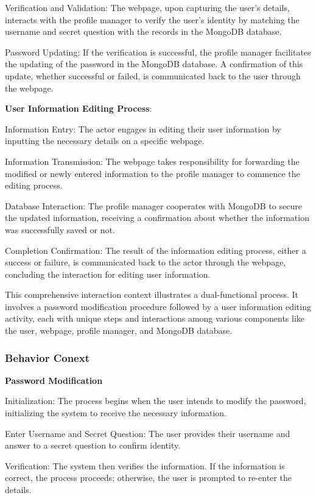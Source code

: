 \documentclass[conference]{IEEEtran}
\begin{document}
Verification and Validation: The webpage, upon capturing the user's details, interacts with the profile manager to verify the user's identity by matching the username and secret question with the records in the MongoDB database.

Password Updating: If the verification is successful, the profile manager facilitates the updating of the password in the MongoDB database. A confirmation of this update, whether successful or failed, is communicated back to the user through the webpage.

\textbf{ User Information Editing Process}:

Information Entry: The actor engages in editing their user information by inputting the necessary details on a specific webpage.

Information Transmission: The webpage takes responsibility for forwarding the modified or newly entered information to the profile manager to commence the editing process.

Database Interaction: The profile manager cooperates with MongoDB to secure the updated information, receiving a confirmation about whether the information was successfully saved or not.

Completion Confirmation: The result of the information editing process, either a success or failure, is communicated back to the actor through the webpage, concluding the interaction for editing user information.

This comprehensive interaction context illustrates a dual-functional process. It involves a password modification procedure followed by a user information editing activity, each with unique steps and interactions among various components like the user, webpage, profile manager, and MongoDB database.

\subsubsection{\textbf{Behavior Conext }}
\textbf{ }

\textbf{ Password Modification}

Initialization: The process begins when the user intends to modify the password, initializing the system to receive the necessary information.

Enter Username and Secret Question: The user provides their username and answer to a secret question to confirm identity.

Verification: The system then verifies the information. If the information is correct, the process proceeds; otherwise, the user is prompted to re-enter the details.
\end{document}
